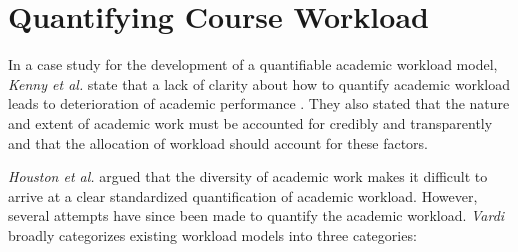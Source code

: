 \section{Quantifying Course Workload}

In a case study for the development of a quantifiable academic workload model, \textit{Kenny et al.} state that a lack of clarity about how to quantify academic workload leads to deterioration of academic performance \cite{kenny2012placing}. They also stated that the nature and extent of academic work must be accounted for credibly and transparently and that the allocation of workload should account for these factors.

\textit{Houston et al.} \cite{houston2006academic} argued that the diversity of academic work makes it difficult to arrive at a clear standardized quantification of academic workload. However, several attempts have since been made to quantify the academic workload. \textit{Vardi} \cite{vardi2009impacts} broadly categorizes existing workload models into three categories:

